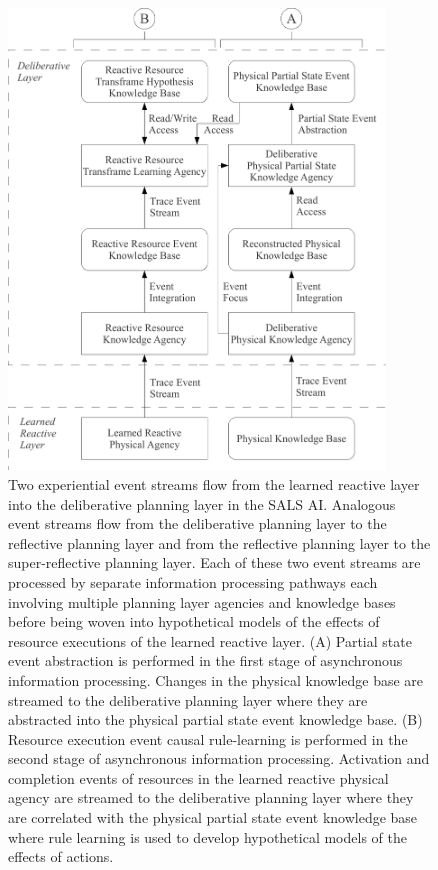 \begin{figure}
\centering
\includegraphics[width=10cm]{gfx/deliberative_two_experiential_event_streams}
\caption[Two experiential event streams flow from the learned reactive
  layer into the deliberative planning layer in the SALS AI.]{Two
  experiential event streams flow from the learned reactive layer into
  the deliberative planning layer in the SALS AI.  Analogous event
  streams flow from the deliberative planning layer to the reflective
  planning layer and from the reflective planning layer to the
  super-reflective planning layer.  Each of these two event streams
  are processed by separate information processing pathways each
  involving multiple planning layer agencies and knowledge bases
  before being woven into hypothetical models of the effects of
  resource executions of the learned reactive layer.  (A) Partial
  state event abstraction is performed in the first stage of
  asynchronous information processing.  Changes in the physical
  knowledge base are streamed to the deliberative planning layer where
  they are abstracted into the physical partial state event knowledge
  base.  (B) Resource execution event causal rule-learning is
  performed in the second stage of asynchronous information
  processing.  Activation and completion events of resources in the
  learned reactive physical agency are streamed to the deliberative
  planning layer where they are correlated with the physical partial
  state event knowledge base where rule learning is used to develop
  hypothetical models of the effects of actions.}
\label{figure:deliberative_two_experiential_event_streams}
\end{figure}
